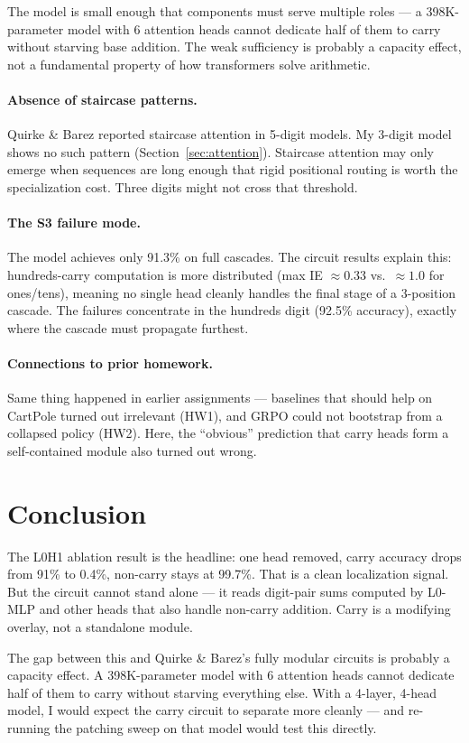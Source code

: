 \documentclass{article}
\begin{document}
The model is small enough that components must serve multiple roles --- a 398K-parameter model with 6 attention heads cannot dedicate half of them to carry without starving base addition. The weak sufficiency is probably a capacity effect, not a fundamental property of how transformers solve arithmetic.

\paragraph{Absence of staircase patterns.}
Quirke \& Barez reported staircase attention in 5-digit models.
My 3-digit model shows no such pattern (Section~\ref{sec:attention}).
Staircase attention may only emerge when sequences are long enough that rigid positional routing is worth the specialization cost. Three digits might not cross that threshold.

\paragraph{The S3 failure mode.}
The model achieves only 91.3\% on full cascades.
The circuit results explain this: hundreds-carry computation is more distributed (max IE ${\approx}0.33$ vs.\ ${\approx}1.0$ for ones/tens), meaning no single head cleanly handles the final stage of a 3-position cascade.
The failures concentrate in the hundreds digit (92.5\% accuracy), exactly where the cascade must propagate furthest.

\paragraph{Connections to prior homework.}
Same thing happened in earlier assignments --- baselines that should help on CartPole turned out irrelevant (HW1), and GRPO could not bootstrap from a collapsed policy (HW2). Here, the ``obvious'' prediction that carry heads form a self-contained module also turned out wrong.

\section{Conclusion}
\label{sec:conclusion}

The L0H1 ablation result is the headline: one head removed, carry accuracy drops from 91\% to 0.4\%, non-carry stays at 99.7\%. That is a clean localization signal. But the circuit cannot stand alone --- it reads digit-pair sums computed by L0-MLP and other heads that also handle non-carry addition. Carry is a modifying overlay, not a standalone module.

The gap between this and Quirke \& Barez's fully modular circuits is probably a capacity effect. A 398K-parameter model with 6 attention heads cannot dedicate half of them to carry without starving everything else. With a 4-layer, 4-head model, I would expect the carry circuit to separate more cleanly --- and re-running the patching sweep on that model would test this directly.



\end{document}
